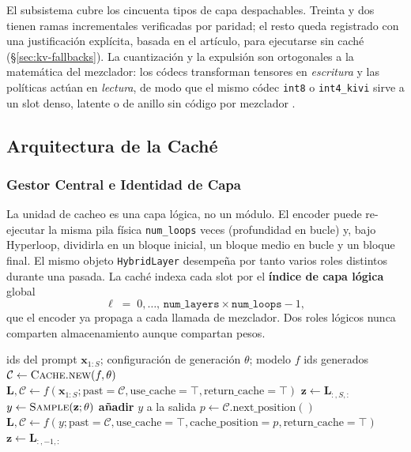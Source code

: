 El subsistema cubre los cincuenta tipos de capa despachables. Treinta y dos tienen ramas incrementales verificadas por paridad; el resto queda registrado con una justificación explícita, basada en el artículo, para ejecutarse sin caché (\S\ref{sec:kv-fallbacks}). La cuantización y la expulsión son ortogonales a la matemática del mezclador: los códecs transforman tensores en \emph{escritura} y las políticas actúan en \emph{lectura}, de modo que el mismo códec \texttt{int8} o \texttt{int4\_kivi} sirve a un slot denso, latente o de anillo sin código por mezclador \citep{kivi_liu_2024,kvquant_hooper_2024,skvq_duanmu_2024}.

\subsection{Arquitectura de la Caché}
\label{sec:kv-architecture}

\subsubsection{Gestor Central e Identidad de Capa}

La unidad de cacheo es una capa lógica, no un módulo. El encoder puede re-ejecutar la misma pila física \texttt{num\_loops} veces (profundidad en bucle) y, bajo Hyperloop, dividirla en un bloque inicial, un bloque medio en bucle y un bloque final. El mismo objeto \texttt{HybridLayer} desempeña por tanto varios roles distintos durante una pasada. La caché indexa cada slot por el \textbf{índice de capa lógica} global
\[
\ell \;=\; 0,\dots,\, \texttt{num\_layers}\times\texttt{num\_loops}-1 ,
\]
que el encoder ya propaga a cada llamada de mezclador. Dos roles lógicos nunca comparten almacenamiento aunque compartan pesos.

\begin{algorithm}[H]
\caption{Bucle de generación con caché (prefill + decodificación)}
\begin{algorithmic}[1]
\Require ids del prompt $\mathbf{x}_{1:S}$; configuración de generación $\theta$; modelo $f$
\Ensure ids generados
\State $\mathcal{C} \gets \textsc{Cache.new}(f,\theta)$ 
\State $\mathbf{L}, \mathcal{C} \gets f(\mathbf{x}_{1:S}; \text{past}=\mathcal{C}, \text{use\_cache}=\top, \text{return\_cache}=\top)$ 
\State $\mathbf{z} \gets \mathbf{L}_{:,S,:}$
    \State $y \gets \textsc{Sample}(\mathbf{z};\theta)$ 
    \State \textbf{añadir} $y$ a la salida
        \State $p \gets \mathcal{C}.\text{next\_position}()$
        \State $\mathbf{L}, \mathcal{C} \gets f(y; \text{past}=\mathcal{C}, \text{use\_cache}=\top, \text{cache\_position}=p, \text{return\_cache}=\top)$
        \State $\mathbf{z} \gets \mathbf{L}_{:,-1,:}$
    \EndIf
\EndFor
\end{algorithmic}
\end{algorithm}

